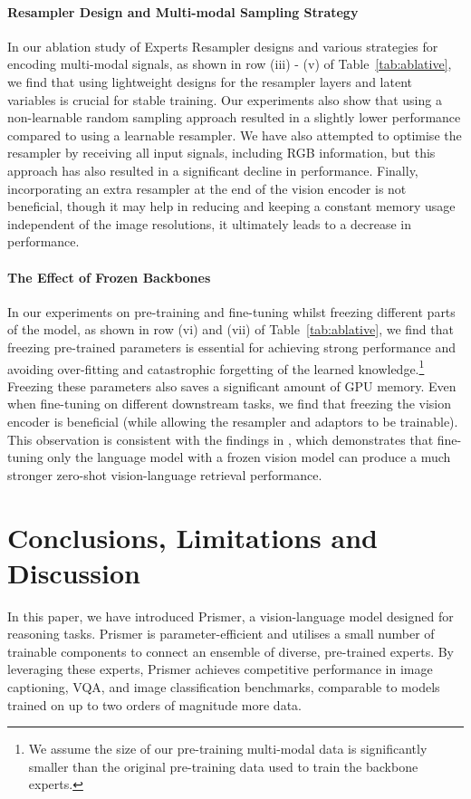 \documentclass[11pt]{article}
\begin{document}
{\paragraph{Resampler Design and Multi-modal Sampling Strategy} In our ablation study of Experts Resampler designs and various strategies for encoding multi-modal signals, as shown in row (iii) - (v) of Table~\ref{tab:ablative}, we find that using lightweight designs for the resampler layers and latent variables is crucial for stable training.  Our experiments also show that using a non-learnable random sampling approach resulted in a  slightly lower performance compared to using a learnable resampler. We have also attempted to optimise the resampler by receiving all input signals, including RGB information, but this approach has also resulted in a significant decline in performance. Finally, incorporating an extra resampler at the end of the vision encoder is not beneficial, though it may help in reducing and keeping a constant memory usage independent of the  image resolutions, it ultimately leads to a decrease in performance.


\paragraph{The Effect of Frozen Backbones}  In our experiments on pre-training and fine-tuning whilst freezing different parts of the model, as shown in row (vi) and (vii) of Table~\ref{tab:ablative}, we find that freezing pre-trained parameters is essential for achieving strong performance and avoiding over-fitting and catastrophic forgetting of the learned knowledge.\footnote{We assume the size of our pre-training multi-modal data is significantly smaller than the original pre-training data used to train the backbone experts.} Freezing these parameters also saves a significant amount of GPU memory. Even when fine-tuning on different downstream tasks, we find that freezing the vision encoder is beneficial (while allowing the resampler and adaptors to be trainable). This observation is consistent with the findings in \cite{zhai2022lit}, which demonstrates that fine-tuning only the language model with a frozen vision model can produce a much stronger zero-shot vision-language retrieval performance.



\section{Conclusions, Limitations and Discussion}
In this paper, we have introduced Prismer, a vision-language model designed for reasoning tasks. Prismer is parameter-efficient and utilises a small number of trainable components to connect an ensemble of diverse, pre-trained experts. By leveraging these experts, Prismer achieves competitive performance in image captioning, VQA, and image classification benchmarks, comparable to models trained on up to two orders of magnitude more data.

}
\end{document}
